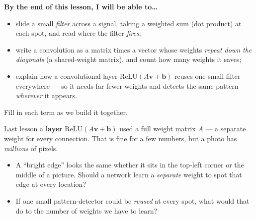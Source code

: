\documentclass[10pt]{article}
\newcommand{\vv}{\mathbf{v}}
\newcommand{\bb}{\mathbf{b}}
\newcommand{\relu}{\mathrm{ReLU}}
\begin{document}
\namedateperiod

\vspace{0.12in}

\begin{objectivebox}
\textbf{By the end of this lesson, I will be able to\dots}
\begin{itemize}\setlength{\itemsep}{2pt}
  \item slide a small \emph{filter} across a signal, taking a weighted sum (dot product) at each spot, and read where the filter \emph{fires};
  \item write a convolution as a matrix times a vector whose weights \emph{repeat down the diagonals} (a shared-weight matrix), and count how many weights it saves;
  \item explain how a convolutional layer $\relu(A\vv+\bb)$ reuses one small filter everywhere --- so it needs far fewer weights and detects the same pattern \emph{wherever} it appears.
\end{itemize}
\end{objectivebox}

\vspace{0.06in}

\begin{vocabbox}
\small
Fill in each term as we build it together.
\vspace{2pt}
\end{vocabbox}

\begin{hookbox}
Last lesson a \textbf{layer} $\relu(A\vv+\bb)$ used a full weight matrix $A$ --- a separate weight for every
connection. That is fine for a few numbers, but a photo has \emph{millions} of pixels.
\begin{itemize}\setlength{\itemsep}{1pt}
  \item A ``bright edge'' looks the same whether it sits in the top-left corner or the middle of a picture. Should a network learn a \emph{separate} weight to spot that edge at every location? \writeline
  \item If one small pattern-detector could be \emph{reused} at every spot, what would that do to the number of weights we have to learn? \writeline
\end{itemize}
\end{hookbox}
\end{document}
